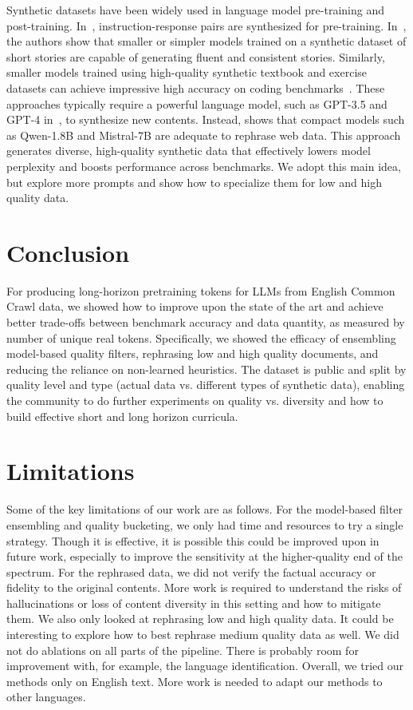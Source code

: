 \documentclass[11pt]{article}
\begin{document}
Synthetic datasets have been widely used in language model pre-training and post-training. In~\citep{cheng2024instructionpretraininglanguagemodels}, instruction-response pairs are synthesized for pre-training.
In~\citep{eldan2023tinystories}, the authors show that smaller or simpler models trained on a synthetic dataset of short stories are capable of generating fluent and consistent stories. Similarly, smaller models trained using high-quality synthetic textbook and exercise datasets can achieve impressive high accuracy on coding benchmarks~\citep{gunasekar2023textbooks,li2023textbooks}.
These approaches typically require a powerful language model, such as GPT-3.5 and GPT-4 in~\citep{eldan2023tinystories}, to synthesize new contents.
Instead, \citep{maini2024rephrasing} shows that compact models such as Qwen-1.8B and Mistral-7B are adequate to rephrase web data. This approach generates diverse, high-quality synthetic data that effectively lowers model perplexity and boosts performance across benchmarks.
We adopt this main idea, but explore more prompts and show how to specialize them for low and high quality data.


\section{Conclusion}

For producing long-horizon pretraining tokens for LLMs from English Common Crawl data, we showed how to improve upon the state of the art and achieve better trade-offs between benchmark accuracy and data quantity, as measured by number of unique real tokens. Specifically, we showed the efficacy of ensembling model-based quality filters, rephrasing low and high quality documents, and reducing the reliance on non-learned heuristics. The dataset is public and split by quality level and type (actual data vs. different types of synthetic data), enabling the community to do further experiments on quality vs. diversity and how to build effective short and long horizon curricula.

\section{Limitations}

Some of the key limitations of our work are as follows. For the model-based filter ensembling and quality bucketing, we only had time and resources to try a single strategy. Though it is effective, it is possible this could be improved upon in future work, especially to improve the sensitivity at the higher-quality end of the spectrum. For the rephrased data, we did not verify the factual accuracy or fidelity to the original contents. More work is required to understand the risks of hallucinations or loss of content diversity in this setting and how to mitigate them. We also only looked at rephrasing low and high quality data. It could be interesting to explore how to best rephrase medium quality data as well. We did not do ablations on all parts of the pipeline. There is probably room for improvement with, for example, the language identification. Overall, we tried our methods only on English text. More work is needed to adapt our methods to other languages.
\end{document}
